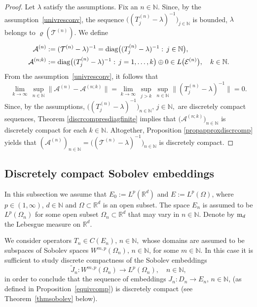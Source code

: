 \documentclass[a4paper,reqno]{amsart}
\begin{document}
\begin{proof}
Let $\lambda$ satisfy the assumptions. Fix an $n\in{\mathbb{N}}$. Since, by the  assumption~\eqref{univresconv}, the sequence  $\big((T_j^{(n)}-\lambda)^{-1}\big)_{j\in{\mathbb{N}}}$ is bounded,  $\lambda$ belongs to $\varrho({\mathcal T}^{(n)})$.
We define
\begin{align*}
{\mathcal A}^{(n)}&:=({\mathcal T}^{(n)}-\lambda)^{-1}={{\rm diag} }\big((T_j^{(n)}-\lambda)^{-1}:\,j\in{\mathbb{N}}\big), \\
{\mathcal A}^{(n;k)}&:={{\rm diag} }\big((T_j^{(n)}-\lambda)^{-1}:\,j=1,\dots,k\big)\oplus 0\in L\big({\mathcal E}^{(n)}\big), \quad k\in{\mathbb{N}}.
\end{align*}
From the assumption~\eqref{univresconv}, it follows that
$$\lim_{k\to\infty}\,\sup_{n\in{\mathbb{N}}}\big\|{\mathcal A}^{(n)}-{\mathcal A}^{(n;k)}\big\|=\lim_{k\to\infty}\,\sup_{j>k}\,\sup_{n\in{\mathbb{N}}}\big\|(T_j^{(n)}-\lambda)^{-1}\big\|=0.$$
Since, by the assumptions, $\big((T_j^{(n)}-\lambda)^{-1}\big)_{n\in{\mathbb{N}}}, \, j\in{\mathbb{N}},$ are discretely compact sequences, Theorem  \ref{discrcompresdiagfinite} implies that
$\big({\mathcal A}^{(n;k)}\big)_{n\in{\mathbb{N}}}$ is discretely compact for each $k\in{\mathbb{N}}$. Altogether, Proposition \ref{propapproxdiscrcomp} yields that $({\mathcal A}^{(n)})_{n\in{\mathbb{N}}}=\big(({\mathcal T}^{(n)}-\lambda)^{-1}\big)_{n\in{\mathbb{N}}}$ is discretely compact.
\end{proof}

\subsection{Discretely compact Sobolev embeddings}\label{subsectionsobolev}

In this subsection we assume that $E_0:=L^p({\mathbb{R}}^d)$ and $E:=L^p(\Omega)$, where  $p\in(1,\infty)$, $d\in{\mathbb{N}}$ and $\Omega\subset{\mathbb{R}}^d$ is an open subset.
The space $E_n$ is assumed to be $L^p(\Omega_n)$ for some open subset $\Omega_n\subset{\mathbb{R}}^d$ that may vary in $n\in{\mathbb{N}}$.
 Denote by ${\rm m}_d$  the Lebesgue measure on ${\mathbb{R}}^d$.

We consider operators $T_n\in C(E_n), \,n\in{\mathbb{N}},$ whose domains are assumed to be subspaces of Sobolev spaces $W^{m,p}(\Omega_n), \,n\in{\mathbb{N}}$, for some $m\in{\mathbb{N}}$.
In this case it is sufficient to study discrete compactness of the Sobolev embeddings $$\widetilde J_n: W^{m,p}(\Omega_n)\to L^p(\Omega_n), \quad n\in{\mathbb{N}},$$ 
in order to conclude that the sequence of embeddings $J_n:D_n\to E_n$, $n\in{\mathbb{N}}$, (as defined in Proposition~\ref{equivcomp}) is discretely compact (see Theorem~\ref{thmsobolev} below).
\end{document}
